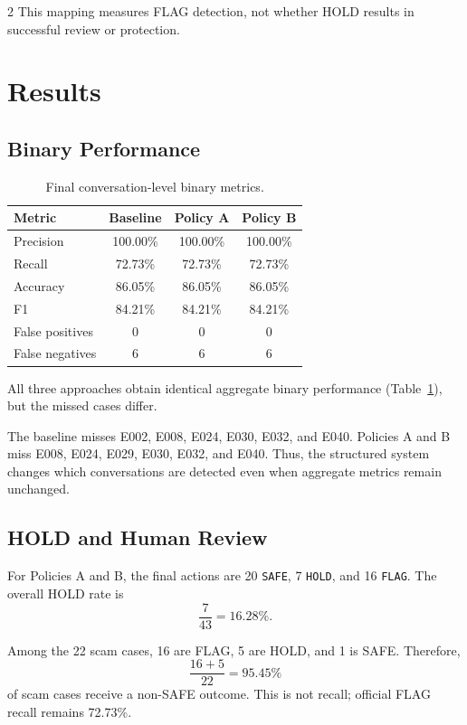 \documentclass{article}
\begin{document}
\begin{multicols}{2}
This mapping measures FLAG detection, not whether HOLD results in successful review or protection.

\section{Results}

\subsection{Binary Performance}

\begin{table}[t]
\centering
\caption{Final conversation-level binary metrics.}
\label{tab:binary}
\begin{tabular}{lccc}
\toprule
Metric & Baseline & Policy A & Policy B \\
\midrule
Precision & 100.00\% & 100.00\% & 100.00\% \\
Recall & 72.73\% & 72.73\% & 72.73\% \\
Accuracy & 86.05\% & 86.05\% & 86.05\% \\
F1 & 84.21\% & 84.21\% & 84.21\% \\
False positives & 0 & 0 & 0 \\
False negatives & 6 & 6 & 6 \\
\bottomrule
\end{tabular}
\end{table}

All three approaches obtain identical aggregate binary performance (Table~\ref{tab:binary}), but the missed cases differ.

The baseline misses E002, E008, E024, E030, E032, and E040. Policies A and B miss E008, E024, E029, E030, E032, and E040. Thus, the structured system changes which conversations are detected even when aggregate metrics remain unchanged.

\subsection{HOLD and Human Review}

For Policies A and B, the final actions are 20 \texttt{SAFE}, 7 \texttt{HOLD}, and 16 \texttt{FLAG}. The overall HOLD rate is
\[
\frac{7}{43}=16.28\%.
\]

Among the 22 scam cases, 16 are FLAG, 5 are HOLD, and 1 is SAFE. Therefore,
\[
\frac{16+5}{22}=95.45\%
\]
of scam cases receive a non-SAFE outcome. This is not recall; official FLAG recall remains 72.73\%.


\end{multicols}
\end{document}
